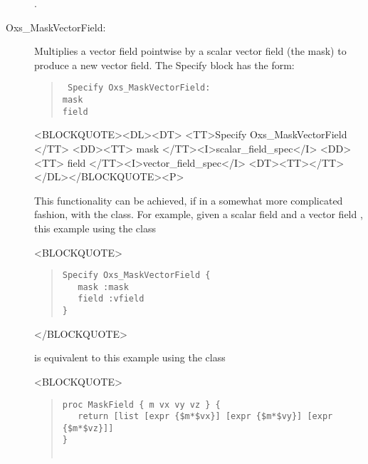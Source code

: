 \begin{description}
\begin{ExampleMifs}[Example]
  .
\end{ExampleMifs}

\item[Oxs\_MaskVectorField:\label{item:MaskVectorField}]
%
Multiplies a vector field pointwise by a scalar vector field (the mask)
to produce a new vector field.  The Specify block has the form:
\begin{latexonly}
\begin{quote}\tt
Specify Oxs\_MaskVectorField: \ocb\\
 \bi mask  \\
 \bi field \\
\ccb
\end{quote}
\end{latexonly}
\begin{rawhtml}
<BLOCKQUOTE><DL><DT>
<TT>Specify Oxs_MaskVectorField {</TT>
<DD><TT> mask </TT><I>scalar_field_spec</I>
<DD><TT> field </TT><I>vector_field_spec</I>
<DT><TT>}</TT></DL></BLOCKQUOTE><P>
\end{rawhtml}
This functionality can be achieved, if in a somewhat more complicated
fashion, with the
class.  For example, given a scalar field  and a vector field
, this example using the  class
\begin{rawhtml}
<BLOCKQUOTE>
\end{rawhtml}
\begin{quote}
\begin{verbatim}
Specify Oxs_MaskVectorField {
   mask :mask
   field :vfield
}
\end{verbatim}
\end{quote}
\begin{rawhtml}
</BLOCKQUOTE>
\end{rawhtml}
is equivalent to this example using the 
class
\begin{rawhtml}
<BLOCKQUOTE>
\end{rawhtml}
\begin{quote}
\begin{verbatim}
proc MaskField { m vx vy vz } {
   return [list [expr {$m*$vx}] [expr {$m*$vy}] [expr {$m*$vz}]]
}


\end{verbatim}
\end{quote}
\end{description}
